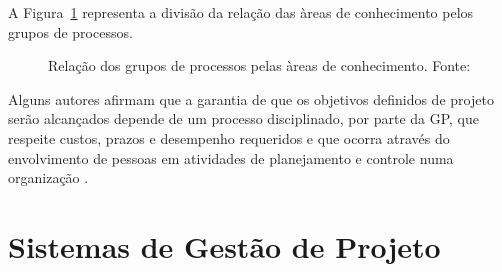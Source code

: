 A Figura~\ref{processos_areas_pmbok} representa a divisão da relação das àreas de conhecimento pelos grupos de processos.

\begin{figure}[ht]
  \centering
  \caption{Relação dos grupos de processos pelas àreas de conhecimento. Fonte: \cite{pmiguide2014}}
  \label{processos_areas_pmbok}
\end{figure}

Alguns autores afirmam que a garantia de que os objetivos definidos de projeto serão alcançados depende de um processo disciplinado, por parte da GP, que respeite custos, prazos e desempenho requeridos e que ocorra através do envolvimento de pessoas em atividades de planejamento e controle numa organização \cite{dinsmore2009ama, meredith2011project}.


\section{Sistemas de Gestão de Projeto}

